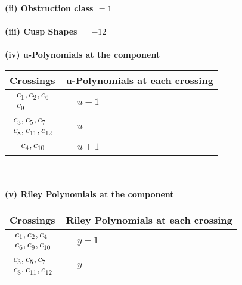 \documentclass[1p]{elsarticle_modified}
\theoremstyle{definition}
\begin{document}
\flushleft \textbf{(ii) Obstruction class $= 1$}\\~\\
\flushleft \textbf{(iii) Cusp Shapes $= -12$}\\~\\
\newpage\renewcommand{\arraystretch}{1}
\flushleft \textbf{(iv) u-Polynomials at the component}\newline \\
\begin{tabular}{m{50pt}|m{274pt}}
Crossings & \hspace{64pt}u-Polynomials at each crossing \\
\hline $$\begin{aligned}c_{1},c_{2},c_{6}\\c_{9}\end{aligned}$$&$\begin{aligned}
&u-1
\end{aligned}$\\
\hline $$\begin{aligned}c_{3},c_{5},c_{7}\\c_{8},c_{11},c_{12}\end{aligned}$$&$\begin{aligned}
&u
\end{aligned}$\\
\hline $$\begin{aligned}c_{4},c_{10}\end{aligned}$$&$\begin{aligned}
&u+1
\end{aligned}$\\
\hline
\end{tabular}\\~\\
\newpage\renewcommand{\arraystretch}{1}
\flushleft \textbf{(v) Riley Polynomials at the component}\newline \\
\begin{tabular}{m{50pt}|m{274pt}}
Crossings & \hspace{64pt}Riley Polynomials at each crossing \\
\hline $$\begin{aligned}c_{1},c_{2},c_{4}\\c_{6},c_{9},c_{10}\end{aligned}$$&$\begin{aligned}
&y-1
\end{aligned}$\\
\hline $$\begin{aligned}c_{3},c_{5},c_{7}\\c_{8},c_{11},c_{12}\end{aligned}$$&$\begin{aligned}
&y
\end{aligned}$\\
\hline
\end{tabular}\\~\\
\end{document}
